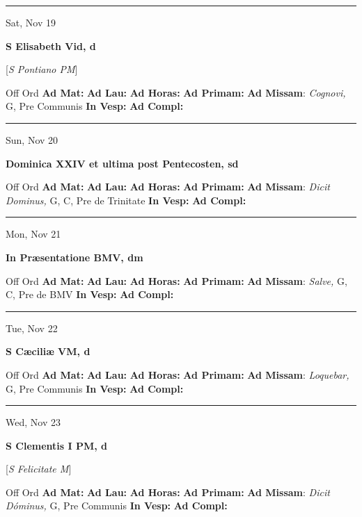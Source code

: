 \documentclass[letterpaper, 10pt]{article}
\begin{document}
\hrule
\begin{center}
Sat, Nov 19
\end{center}\textbf{ \large S Elisabeth Vid, \textnormal{\normalsize d}}

[\textit{S Pontiano PM}]
\begin{justify}
Off Ord
\textbf{Ad Mat: }
\textbf{Ad Lau: }
\textbf{Ad Horas: }
\textbf{Ad Primam: }
\textbf{Ad Missam}: \textit{Cognovi,} G, Pre Communis
\textbf{In Vesp: }
\textbf{Ad Compl: }\end{justify}



\hrule
\begin{center}
Sun, Nov 20
\end{center}\textbf{ \large Dominica XXIV et ultima post Pentecosten, \textnormal{\normalsize sd}}
\begin{justify}
Off Ord
\textbf{Ad Mat: }
\textbf{Ad Lau: }
\textbf{Ad Horas: }
\textbf{Ad Primam: }
\textbf{Ad Missam}: \textit{Dicit Dominus,} G, C, Pre de Trinitate
\textbf{In Vesp: }
\textbf{Ad Compl: }\end{justify}



\hrule
\begin{center}
Mon, Nov 21
\end{center}\textbf{ \large In Præsentatione BMV, \textnormal{\normalsize dm}}
\begin{justify}
Off Ord
\textbf{Ad Mat: }
\textbf{Ad Lau: }
\textbf{Ad Horas: }
\textbf{Ad Primam: }
\textbf{Ad Missam}: \textit{Salve,} G, C, Pre de BMV
\textbf{In Vesp: }
\textbf{Ad Compl: }\end{justify}



\hrule
\begin{center}
Tue, Nov 22
\end{center}\textbf{ \large S Cæciliæ VM, \textnormal{\normalsize d}}
\begin{justify}
Off Ord
\textbf{Ad Mat: }
\textbf{Ad Lau: }
\textbf{Ad Horas: }
\textbf{Ad Primam: }
\textbf{Ad Missam}: \textit{Loquebar,} G, Pre Communis
\textbf{In Vesp: }
\textbf{Ad Compl: }\end{justify}



\hrule
\begin{center}
Wed, Nov 23
\end{center}\textbf{ \large S Clementis I PM, \textnormal{\normalsize d}}

[\textit{S Felicitate M}]
\begin{justify}
Off Ord
\textbf{Ad Mat: }
\textbf{Ad Lau: }
\textbf{Ad Horas: }
\textbf{Ad Primam: }
\textbf{Ad Missam}: \textit{Dicit Dóminus,} G, Pre Communis
\textbf{In Vesp: }
\textbf{Ad Compl: }\end{justify}
\end{document}
